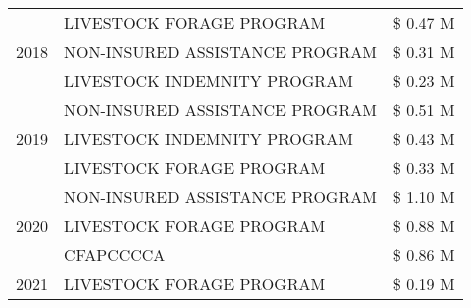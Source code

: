 \begin{tabular}{llr}
\cline{1-3}
\multirow[t]{3}{*}{2018} & LIVESTOCK FORAGE PROGRAM & \$ 0.47 M \\
 & NON-INSURED ASSISTANCE PROGRAM & \$ 0.31 M \\
 & LIVESTOCK INDEMNITY PROGRAM & \$ 0.23 M \\
\cline{1-3}
\multirow[t]{3}{*}{2019} & NON-INSURED ASSISTANCE PROGRAM & \$ 0.51 M \\
 & LIVESTOCK INDEMNITY PROGRAM & \$ 0.43 M \\
 & LIVESTOCK FORAGE PROGRAM & \$ 0.33 M \\
\cline{1-3}
\multirow[t]{3}{*}{2020} & NON-INSURED ASSISTANCE PROGRAM & \$ 1.10 M \\
 & LIVESTOCK FORAGE PROGRAM & \$ 0.88 M \\
 & CFAPCCCCA & \$ 0.86 M \\
\cline{1-3}
2021 & LIVESTOCK FORAGE PROGRAM & \$ 0.19 M \\
\cline{1-3}
\bottomrule
\end{tabular}
